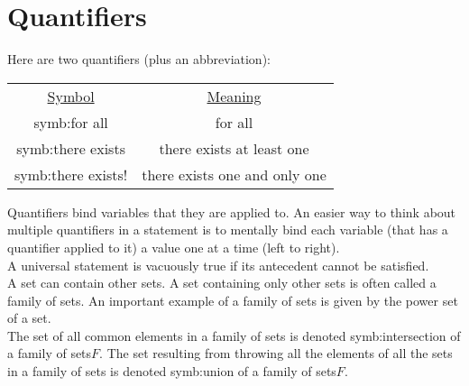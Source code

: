 \documentclass{article}
\begin{document}
\section{Quantifiers}
Here are two quantifiers (plus an abbreviation):
\begin{center}
\begin{tabular}{@{}cc@{}}
	\underline{Symbol} & \underline{Meaning} \\
	\gls{symb:for all} & for all \\
	\gls{symb:there exists} & there exists at least one\\
    \gls{symb:there exists!} & there exists one and only one\\
\end{tabular}
\end{center}
Quantifiers bind variables that they are applied to. An easier way to think about multiple quantifiers in a statement is to mentally bind each variable (that has a quantifier applied to it) a value one at a time (left to right).\\

\noindent A universal statement is \gls{vacuously true} if its \gls{antecedent} cannot be satisfied.\\

\noindent A set can contain other sets. A set containing only other sets is often called a \gls{family of sets}. An important example of a family of sets is given by the \gls{power set} of a set.\\

\noindent The set of all common elements in a family of sets is denoted \gls{symb:intersection of a family of sets}$F$. The set resulting from throwing all the elements of all the sets in a family of sets is denoted \gls{symb:union of a family of sets}$F$.

\clearpage
\printglossary[type=\acronymtype,style=long]  %
\printglossary[type=symbolslist,style=long]   %
\printglossary[type=main]                     %
\end{document}
